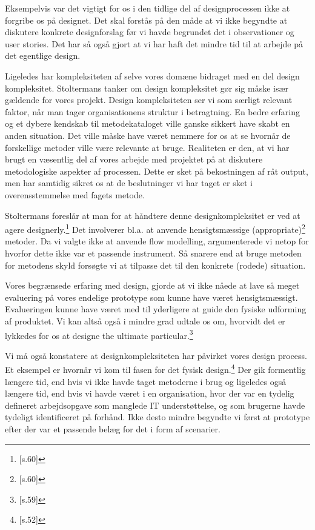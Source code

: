 Eksempelvis var det vigtigt for os i den tidlige del af designprocessen ikke at forgribe os på designet. Det skal forstås på den måde at vi ikke begyndte at diskutere konkrete designforslag før vi havde begrundet det i observationer og user stories. Det har så også gjort at vi har haft det mindre tid til at arbejde på det egentlige design.

Ligeledes har kompleksiteten af selve vores domæne bidraget med en del design kompleksitet. Stoltermans tanker om design kompleksitet gør sig måske især gældende for vores projekt. Design kompleksiteten ser vi som særligt relevant faktor, når man tager organisationens struktur i betragtning. En bedre erfaring og et dybere kendskab til metodekataloget ville ganske sikkert have skabt en anden situation. Det ville måske have været nemmere for os at se hvornår de forskellige metoder ville være relevante at bruge. Realiteten er den, at vi har brugt en væsentlig del af vores arbejde med projektet på at diskutere metodologiske aspekter af processen. Dette er sket på bekostningen af råt output, men har samtidig sikret os at de beslutninger vi har taget er sket i overensstemmelse med fagets metode.

Stoltermans foreslår at man for at håndtere denne designkompleksitet er ved at agere designerly.\footnote{\citep{Stolterman}[s.60]} Det involverer bl.a. at anvende hensigtsmæssige (appropriate)\footnote{\citep{Stolterman}[s.60]} metoder. Da vi valgte ikke at anvende flow modelling, argumenterede vi netop for hvorfor dette ikke var et passende instrument. Så snarere end at bruge metoden for metodens skyld forsøgte vi at tilpasse det til den konkrete (rodede) situation. 

Vores begrænsede erfaring med design, gjorde at vi ikke nåede at lave så meget evaluering på vores endelige prototype som kunne have været hensigtsmæssigt. Evalueringen kunne have været med til yderligere at guide den fysiske udforming af produktet. Vi kan altså også i mindre grad udtale os om, hvorvidt det er lykkedes for os at designe the ultimate particular.\footnote{\citep{Stolterman}[s.59]}

Vi må også konstatere at designkompleksiteten har påvirket vores design process. Et eksempel er hvornår vi kom til fasen for det fysisk design.\footnote{\citep{Benyon}[s.52]} Der gik formentlig længere tid, end hvis vi ikke havde taget metoderne i brug og ligeledes også længere tid, end hvis vi havde været i en organisation, hvor der var en tydelig defineret arbejdsopgave som manglede IT understøttelse, og som brugerne havde tydeligt identificeret på forhånd. Ikke desto mindre begyndte vi først at prototype efter der var et passende belæg for det i form af scenarier.

